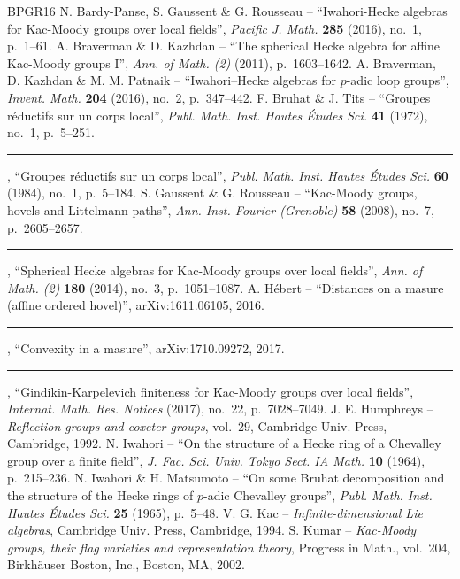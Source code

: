 \documentclass[11pt]{article}
\theoremstyle{definition}
\theoremstyle{remark}
\numberwithin{equation}{section}
\begin{document}
\begin{thebibliography}{BPGR16}
 N. Bardy-Panse, S. Gaussent \& G. Rousseau -- ``Iwahori-Hecke algebras for Kac-Moody groups over local fields'', \emph{Pacific J. Math.} \textbf{285} (2016), no.~1, p.~1--61.
 A. Braverman \& D. Kazhdan -- ``The spherical Hecke algebra for affine Kac-Moody groups I'', \emph{Ann. of Math. (2)} (2011), p.~1603--1642.
 A. Braverman, D. Kazhdan \& M. M. Patnaik -- ``Iwahori--Hecke algebras for $p$-adic loop groups'', \emph{Invent. Math.} \textbf{204} (2016), no.~2, p.~347--442.
 F. Bruhat \& J. Tits -- ``Groupes réductifs sur un corps local'', \emph{Publ. Math. Inst. Hautes Études Sci.} \textbf{41} (1972), no.~1, p.~5--251.
 \rule{1.2em}{0.1pt}, ``Groupes réductifs sur un corps local'', \emph{Publ. Math. Inst. Hautes Études Sci.} \textbf{60} (1984), no.~1, p.~5--184.
 S. Gaussent \& G. Rousseau -- ``Kac-Moody groups, hovels and Littelmann paths'', \emph{Ann. Inst. Fourier (Grenoble)} \textbf{58} (2008), no.~7, p.~2605--2657.
 \rule{1.2em}{0.1pt}, ``Spherical Hecke algebras for Kac-Moody groups over local fields'', \emph{Ann. of Math. (2)} \textbf{180} (2014), no.~3, p.~1051--1087.
 A. Hébert -- ``Distances on a masure (affine ordered hovel)'', arXiv:1611.06105, 2016.
 \rule{1.2em}{0.1pt}, ``Convexity in a masure'', arXiv:1710.09272, 2017.
 \rule{1.2em}{0.1pt}, ``Gindikin-Karpelevich finiteness for Kac-Moody groups over local fields'', \emph{Internat. Math. Res. Notices} (2017), no.~22, p.~7028--7049.
 J. E. Humphreys -- \emph{Reflection groups and coxeter groups}, vol.~29, Cambridge Univ. Press, Cambridge, 1992.
 N. Iwahori -- ``On the structure of a Hecke ring of a Chevalley group over a finite field'', \emph{J. Fac. Sci. Univ. Tokyo Sect. IA Math.} \textbf{10} (1964), p.~215--236.
 N. Iwahori \& H. Matsumoto -- ``On some Bruhat decomposition and the structure of the Hecke rings of $p$-adic Chevalley groups'', \emph{Publ. Math. Inst. Hautes Études Sci.} \textbf{25} (1965), p.~5--48.
 V. G. Kac -- \emph{Infinite-dimensional Lie algebras}, Cambridge Univ. Press, Cambridge, 1994.
 S. Kumar -- \emph{Kac-Moody groups, their flag varieties and representation theory}, Progress in Math., vol.~204, Birkhäuser Boston, Inc., Boston, MA, 2002.

\end{thebibliography}
\end{document}
